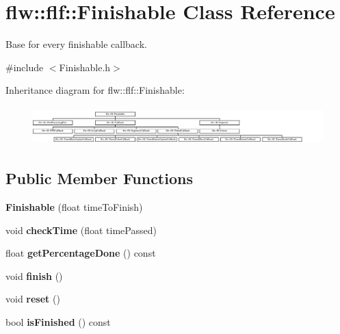 \hypertarget{classflw_1_1flf_1_1Finishable}{}\section{flw\+:\+:flf\+:\+:Finishable Class Reference}
\label{classflw_1_1flf_1_1Finishable}


Base for every finishable callback.  




{\ttfamily \#include $<$Finishable.\+h$>$}

Inheritance diagram for flw\+:\+:flf\+:\+:Finishable\+:\begin{figure}[H]
\begin{center}
\leavevmode
\includegraphics[height=1.488372cm]{classflw_1_1flf_1_1Finishable}
\end{center}
\end{figure}
\subsection*{Public Member Functions}
\begin{DoxyCompactItemize}
\item 
{\bfseries Finishable} (float time\+To\+Finish)\hypertarget{classflw_1_1flf_1_1Finishable_a167dd981e22d9450aefdaf905cfae8bb}{}\label{classflw_1_1flf_1_1Finishable_a167dd981e22d9450aefdaf905cfae8bb}

\item 
void {\bfseries check\+Time} (float time\+Passed)\hypertarget{classflw_1_1flf_1_1Finishable_af3a1125b567dcb2d5c0b4f3ce5246961}{}\label{classflw_1_1flf_1_1Finishable_af3a1125b567dcb2d5c0b4f3ce5246961}

\item 
float {\bfseries get\+Percentage\+Done} () const \hypertarget{classflw_1_1flf_1_1Finishable_ad8321fd3d8e0ff906d8fbf90b657399c}{}\label{classflw_1_1flf_1_1Finishable_ad8321fd3d8e0ff906d8fbf90b657399c}

\item 
void {\bfseries finish} ()\hypertarget{classflw_1_1flf_1_1Finishable_ae050528989ddef860d457264b014d869}{}\label{classflw_1_1flf_1_1Finishable_ae050528989ddef860d457264b014d869}

\item 
void {\bfseries reset} ()\hypertarget{classflw_1_1flf_1_1Finishable_a8f0662da7f8881ce02f9211ba68d4995}{}\label{classflw_1_1flf_1_1Finishable_a8f0662da7f8881ce02f9211ba68d4995}

\item 
bool {\bfseries is\+Finished} () const \hypertarget{classflw_1_1flf_1_1Finishable_abe8603b5371e7b9da0cad3c85796d83f}{}\label{classflw_1_1flf_1_1Finishable_abe8603b5371e7b9da0cad3c85796d83f}

\end{DoxyCompactItemize}
